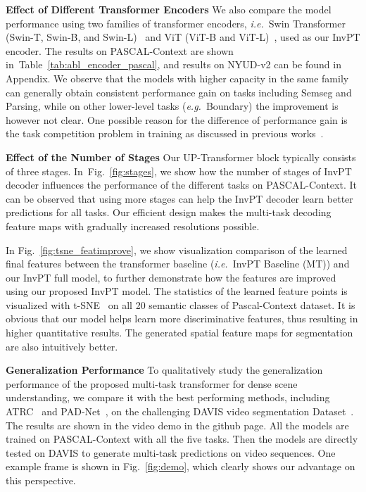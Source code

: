 \documentclass[runningheads]{llncs}
\newcommand*{\eg}{\emph{e.g.}}
\newcommand*{\ie}{\emph{i.e.}}
\begin{document}
\par\noindent\textbf{Effect of Different Transformer Encoders}
We also compare the model performance using two families of transformer encoders, \ie~Swin Transformer (Swin-T, Swin-B, and Swin-L)~\cite{swin} and ViT (ViT-B and ViT-L)~\cite{vit}, used as our InvPT encoder. The results on PASCAL-Context are shown in~Table~\ref{tab:abl_encoder_pascal}, and results on NYUD-v2 can be found in Appendix. We observe that the models with higher capacity in the same family can generally obtain consistent performance gain on tasks including Semseg and Parsing, while on other lower-level tasks (\eg~Boundary) the improvement is however not clear.
One possible reason for the difference of performance gain is the task competition problem in training as discussed in previous works~\cite{sener2018multi,kendall2018multi}.

\par\noindent\textbf{Effect of the Number of Stages} Our UP-Transformer block typically consists of three stages. In~Fig.~\ref{fig:stages}, we show how the number of stages of InvPT decoder influences the performance of the different tasks on PASCAL-Context. It can be observed that using more stages can help the InvPT decoder learn better predictions for all tasks. Our efficient design makes the multi-task decoding feature maps with gradually increased resolutions possible.

\par{}
In Fig.~\ref{fig:tsne_featimprove}, we show visualization comparison of the learned final features between the transformer baseline (\ie~InvPT Baseline (MT)) and our InvPT full model, to further demonstrate how the features are improved using our proposed InvPT model.
The statistics of the learned feature points is visualized with t-SNE~\cite{tsne} on all 20 semantic classes of Pascal-Context dataset. It is obvious that our model helps learn more discriminative features, thus resulting in higher quantitative results. The generated spatial feature maps for segmentation are also intuitively better.

\par\noindent\textbf{Generalization Performance}
To qualitatively study the generalization performance of the proposed multi-task transformer for dense scene understanding, we compare it with the best performing methods, including ATRC~\cite{atrc} and PAD-Net~\cite{padnet}, on the challenging DAVIS video segmentation Dataset~\cite{davis}. The results are shown in the video demo in the github page. All the models are trained on PASCAL-Context with all the five tasks.
Then the models are directly tested on DAVIS to generate multi-task predictions on video sequences. One example frame is shown in Fig.~\ref{fig:demo}, which clearly shows our advantage on this perspective.
\end{document}
